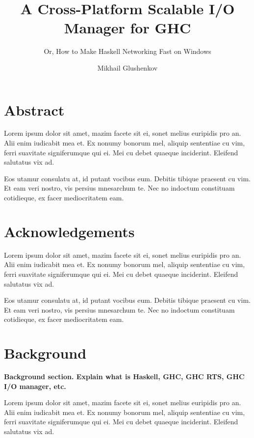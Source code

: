 \documentclass[a4paper,11pt,oneside]{report}
\title{A Cross-Platform Scalable I/O Manager for GHC}
\subtitle{Or, How to Make Haskell Networking Fast on Windows}
\author{Mikhail Glushenkov}
\begin{document}
\maketitle

\chapter*{Abstract}
Lorem ipsum dolor sit amet, mazim facete sit ei, sonet melius euripidis pro
an. Alii enim iudicabit mea et. Ex nonumy bonorum mel, aliquip sententiae cu
vim, ferri suavitate signiferumque qui ei. Mei cu debet quaeque
inciderint. Eleifend salutatus vix ad.

Eos utamur consulatu at, id putant vocibus eum. Debitis tibique praesent cu
vim. Et eam veri nostro, vis persius mnesarchum te. Nec no indoctum constituam
cotidieque, ex facer mediocritatem eam.

\pagebreak

\chapter*{Acknowledgements}

Lorem ipsum dolor sit amet, mazim facete sit ei, sonet melius euripidis pro
an. Alii enim iudicabit mea et. Ex nonumy bonorum mel, aliquip sententiae cu
vim, ferri suavitate signiferumque qui ei. Mei cu debet quaeque
inciderint. Eleifend salutatus vix ad.

Eos utamur consulatu at, id putant vocibus eum. Debitis tibique praesent cu
vim. Et eam veri nostro, vis persius mnesarchum te. Nec no indoctum constituam
cotidieque, ex facer mediocritatem eam.

\pagebreak


\tableofcontents

\pagebreak

\pagestyle{fancy}
\setcounter{page}{1}

\chapter{Background}

\textbf{Background section. Explain what is Haskell, GHC, GHC RTS, GHC I/O
  manager, etc.}

Lorem ipsum dolor sit amet, mazim facete sit ei, sonet melius euripidis pro
an. Alii enim iudicabit mea et. Ex nonumy bonorum mel, aliquip sententiae cu
vim, ferri suavitate signiferumque qui ei. Mei cu debet quaeque
inciderint. Eleifend salutatus vix ad.
\end{document}
